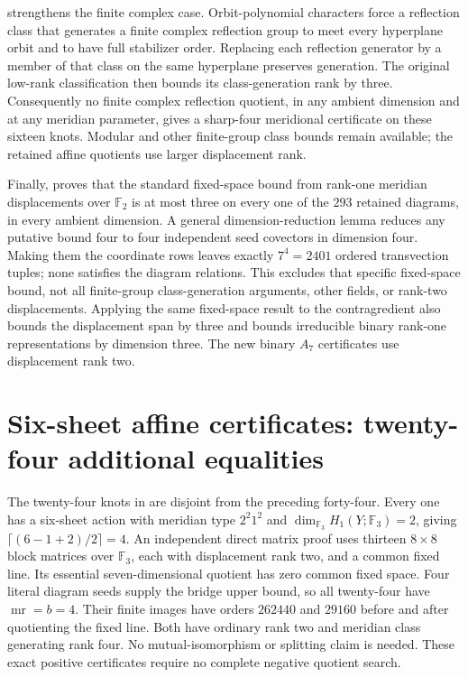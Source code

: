 \documentclass[11pt]{article}
\newcommand{\mr}{\operatorname{mr}}
\newcommand{\F}{\mathbb F}
\begin{document}
 strengthens the finite
complex case. Orbit-polynomial characters force a reflection class
that generates a finite complex reflection group to meet every
hyperplane orbit and to have full stabilizer order. Replacing each
reflection generator by a member of that class on the same hyperplane
preserves generation. The original low-rank classification
\cite[Sections2--4 and TableVII]{st54} then bounds its class-generation
rank by three. Consequently no finite complex reflection quotient,
in any ambient dimension and at any meridian parameter, gives a
sharp-four meridional certificate on these sixteen knots. Modular
and other finite-group class bounds remain available; the retained
affine quotients use larger displacement rank.

Finally,  proves that the standard
fixed-space bound from rank-one meridian displacements over $\F_2$
is at most three on every one of the $293$ retained diagrams, in every
ambient dimension. A general dimension-reduction lemma reduces any
putative bound four to four independent seed covectors in dimension
four. Making them the coordinate rows leaves exactly $7^4=2401$
ordered transvection tuples; none satisfies the diagram relations.
This excludes that specific fixed-space bound, not all finite-group
class-generation arguments, other fields, or rank-two displacements.
Applying the same fixed-space result to the contragredient also
bounds the displacement span by three and bounds irreducible binary
rank-one representations by dimension three. The new binary $A_7$
certificates use displacement rank two.

\section{Six-sheet affine certificates: twenty-four additional equalities}

The twenty-four knots in  are disjoint
from the preceding forty-four. Every one has a six-sheet action with
meridian type $2^2 1^2$ and $\dim_{\F_3}H_1(Y;\F_3)=2$, giving
$\lceil(6-1+2)/2\rceil=4$. An independent direct matrix proof uses
thirteen $8\times8$ block matrices over $\F_3$, each with displacement
rank two, and a common fixed line. Its essential seven-dimensional
quotient has zero common fixed space. Four literal diagram seeds
supply the bridge upper bound, so all twenty-four have $\mr=b=4$.
Their finite images have orders $262440$ and $29160$ before and after
quotienting the fixed line. Both have ordinary rank two and meridian
class generating rank four. No mutual-isomorphism or splitting claim
is needed. These exact positive certificates require no complete
negative quotient search.
\end{document}
